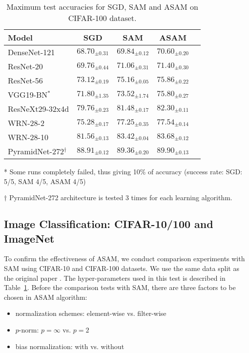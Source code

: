 \documentclass{article}
\newcommand{\mf}[1]{\mathbf{#1}}
\begin{document}
\begin{table}[t]
\ificml
\else
    \centering
\fi
\begin{threeparttable}
\caption{Maximum test accuracies for SGD, SAM and ASAM on CIFAR-100 dataset. \label{table2}}
\begin{center}
\begin{small}
\begin{tabular}{lcccr}
\toprule
Model & SGD & SAM & ASAM \\
\midrule
DenseNet-121 & $68.70_{\pm 0.31}$ & $69.84_{\pm 0.12}$ & $\mf{70.60}_{\pm 0.20}$ \\
ResNet-20 & $69.76_{\pm 0.44}$ & $71.06_{\pm 0.31}$ & $\mf{71.40}_{\pm 0.30}$ \\
ResNet-56 & $73.12_{\pm 0.19}$ & $75.16_{\pm 0.05}$ & $\mf{75.86}_{\pm 0.22}$ \\
VGG19-BN$^*$ & $71.80_{\pm 1.35}$ & $73.52_{\pm 1.74}$ & $\mf{75.80}_{\pm 0.27}$ \\
{\fontsize{8}{9.6}\selectfont ResNeXt29-32x4d} & $79.76_{\pm 0.23}$ & $81.48_{\pm 0.17}$ & $\mf{82.30}_{\pm 0.11}$ \\
WRN-28-2 & $75.28_{\pm 0.17}$ & $77.25_{\pm 0.35}$ & $\mf{77.54}_{\pm 0.14}$ \\
WRN-28-10 & $81.56_{\pm 0.13}$ & $83.42_{\pm 0.04}$ & $\mf{83.68}_{\pm 0.12}$ \\
\midrule
{\fontsize{8.5}{9.6}\selectfont PyramidNet-272}$^\dagger$ & $88.91_{\pm 0.12}$ & $89.36_{\pm 0.20}$ & $\mf{89.90}_{\pm 0.13}$ \\
\bottomrule
\end{tabular}
\begin{tablenotes}
\item[*] Some runs completely failed, thus giving 10\% of accuracy (success rate: SGD: 5/5, SAM 4/5, ASAM 4/5)
\item[$\dagger$] PyramidNet-272 architecture is tested 3 times for each learning algorithm.
\end{tablenotes}
\end{small}
\end{center}
\end{threeparttable}
\end{table}


\subsection{Image Classification: CIFAR-10/100 and ImageNet} \label{cifar}
To confirm the effectiveness of ASAM, we conduct comparison experiments with SAM using CIFAR-10 and CIFAR-100 datasets.
We use the same data split as the original paper \citep{krizhevsky2009cifar}. The hyper-parameters used in this test is described in Table~\ref{table2}. Before the comparison tests with SAM, there are three factors to be chosen in ASAM algorithm:
\begin{itemize}
\item normalization schemes: element-wise vs. filter-wise
\item $p$-norm: $p=\infty$ vs. $p=2$
\item bias normalization: with vs. without
\end{itemize}
\end{document}
